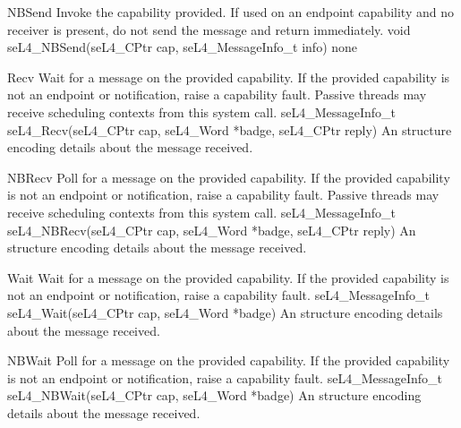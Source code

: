 {NBSend}
{Invoke the capability provided. If used on an endpoint capability and no receiver is present, do
    not send the message and return immediately.}
{void seL4_NBSend(seL4_CPtr cap, seL4_MessageInfo_t info)}
{
}
{none}

{Recv}
{Wait for a message on the provided capability. If the provided capability is not an endpoint or
    notification, raise a capability fault. Passive threads may receive scheduling contexts from 
this system call.}
    {seL4_MessageInfo_t seL4_Recv(seL4_CPtr cap, seL4_Word *badge, seL4_CPtr reply)}
{
}
{An  structure encoding details about the message received.}


{NBRecv}
{Poll for a message on the provided capability. If the provided capability is not an endpoint or
    notification, raise a capability fault. Passive threads may receive scheduling contexts from 
this system call.}
    {seL4_MessageInfo_t seL4_NBRecv(seL4_CPtr cap, seL4_Word *badge, seL4_CPtr reply)}
{
}
{An  structure encoding details about the message received.}

{Wait}
{Wait for a message on the provided capability. If the provided capability is not an endpoint or
    notification, raise a capability fault.}
    {seL4_MessageInfo_t seL4_Wait(seL4_CPtr cap, seL4_Word *badge)}
{
}
{An  structure encoding details about the message received.}

{NBWait}
{Poll for a message on the provided capability. If the provided capability is not an endpoint or
    notification, raise a capability fault.}
    {seL4_MessageInfo_t seL4_NBWait(seL4_CPtr cap, seL4_Word *badge)}
{
}
{An  structure encoding details about the message received.}

